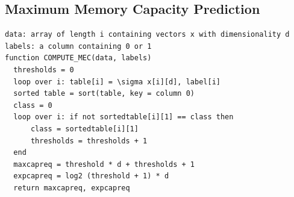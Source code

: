 \documentclass[12pt]{article}
\numberwithin{figure}{section} %
\begin{document}
\subsection{Maximum Memory Capacity Prediction}
\begin{lstlisting}
data: array of length i containing vectors x with dimensionality d 
labels: a column containing 0 or 1
function COMPUTE_MEC(data, labels)
  thresholds = 0
  loop over i: table[i] = \sigma x[i][d], label[i]
  sorted table = sort(table, key = column 0) 
  class = 0
  loop over i: if not sortedtable[i][1] == class then 
      class = sortedtable[i][1]
      thresholds = thresholds + 1
  end
  maxcapreq = threshold * d + thresholds + 1
  expcapreq = log2 (threshold + 1) * d
  return maxcapreq, expcapreq
\end{lstlisting}
\end{document}
